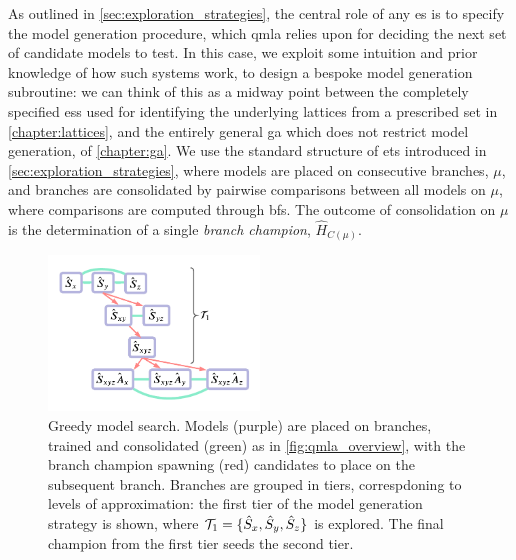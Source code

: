 As outlined in \cref{sec:exploration_strategies}, the central role of any \gls{es} is to specify the 
    model generation procedure, which \gls{qmla} relies upon for deciding the next set of candidate models to test. 
In this case, we exploit some intuition and prior knowledge of how such systems work, 
    to design a bespoke model generation subroutine:
    we can think of this as a midway point between the completely specified \glspl{es} used 
    for identifying the underlying lattices from a prescribed set in \cref{chapter:lattices}, 
    and the entirely general \acrlong{ga} which does not restrict model generation, of \cref{chapter:ga}.
We use the standard structure of \glspl{et} introduced in \cref{sec:exploration_strategies}, 
    where models are placed on consecutive branches, $\mu$, and branches are consolidated by pairwise comparisons between all models on $\mu$, 
    where comparisons are computed through \glspl{bf}.
The outcome of consolidation on $\mu$ is the determination of a single \emph{branch champion}, $\hat{H}_{C(\mu)}$. 
\par 


\begin{figure}
    \begin{center}
        \includegraphics[width=0.5\textwidth]{experimental_study/figures/greedy_search.pdf}
    \end{center}
    \caption[Greedy model search]{
        Greedy model search. 
        Models (purple) are placed on branches, trained and consolidated (green) as in \cref{fig:qmla_overview}, 
            with the branch champion spawning (red) candidates to place on the subsequent branch.  
        Branches are grouped in tiers, correspdoning to levels of approximation:
            the first tier of the model generation strategy is shown, 
            where $\mathcal{T}_1 = \{ \hat{S}_x, \hat{S}_y, \hat{S}_z\}$ is explored. 
        The final champion from the first tier seeds the second tier. 
    }
    \label{fig:greedy_search}
\end{figure}

